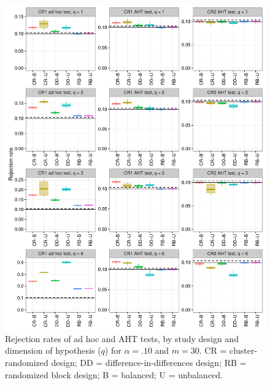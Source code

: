 \documentclass{article}\usepackage[]{graphicx}\usepackage[]{color}
\newenvironment{knitrout}{}{} %
\begin{document}
\begin{knitrout}
\color{fgcolor}\begin{figure}[H]

{\centering \includegraphics[width=\linewidth]{CR_fig/balance_10_30-1} 

}

\caption[Rejection rates of ad hoc and AHT tests, by study design and dimension of hypothesis (]{Rejection rates of ad hoc and AHT tests, by study design and dimension of hypothesis ($q$) for $\alpha = .10$ and $m = 30$. CR = cluster-randomized design; DD = difference-in-differences design; RB = randomized block design; B = balanced; U = unbalanced.}\label{fig:balance_10_30}
\end{figure}


\end{knitrout}
\end{document}
